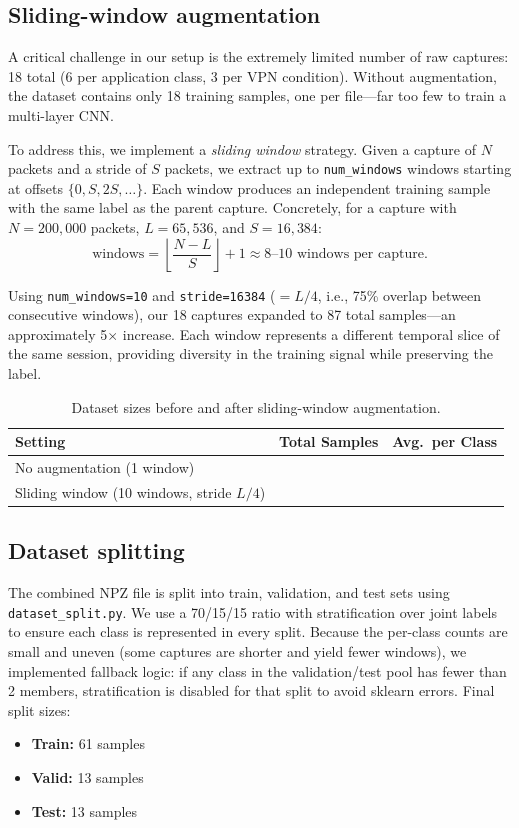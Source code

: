 \documentclass[letterpaper,twocolumn,10pt]{article}
\begin{document}
\subsection{Sliding-window augmentation}
\label{sec:augmentation}
A critical challenge in our setup is the extremely limited number of raw captures: 18 total (6 per application class, 3 per VPN condition). Without augmentation, the dataset contains only 18 training samples, one per file---far too few to train a multi-layer CNN.

To address this, we implement a \emph{sliding window} strategy. Given a capture of $N$ packets and a stride of $S$ packets, we extract up to \texttt{num\_windows} windows starting at offsets $\{0, S, 2S, \ldots\}$. Each window produces an independent training sample with the same label as the parent capture. Concretely, for a capture with $N = 200{,}000$ packets, $L = 65{,}536$, and $S = 16{,}384$:
\[
\text{windows} = \left\lfloor \frac{N - L}{S} \right\rfloor + 1 \approx 8\text{--}10 \text{ windows per capture}.
\]

Using \texttt{num\_windows=10} and \texttt{stride=16384} ($= L/4$, i.e., 75\% overlap between consecutive windows), our 18 captures expanded to 87 total samples---an approximately 5$\times$ increase. Each window represents a different temporal slice of the same session, providing diversity in the training signal while preserving the label.

\begin{table}[H]
\caption{Dataset sizes before and after sliding-window augmentation.}
\centering
\small
\begin{tabularx}{\linewidth}{l >{\centering\arraybackslash}X >{\centering\arraybackslash}X}
\toprule
\textbf{Setting} & \textbf{Total Samples} & \textbf{Avg.\ per Class} \\
\midrule
No augmentation (1 window) & 18 & 3 \\
Sliding window (10 windows, stride $L/4$) & 87 & 14.5 \\
\bottomrule
\end{tabularx}
\end{table}

\subsection{Dataset splitting}
The combined NPZ file is split into train, validation, and test sets using \texttt{dataset\_split.py}. We use a 70/15/15 ratio with stratification over joint labels to ensure each class is represented in every split. Because the per-class counts are small and uneven (some captures are shorter and yield fewer windows), we implemented fallback logic: if any class in the validation/test pool has fewer than 2 members, stratification is disabled for that split to avoid sklearn errors. Final split sizes:
\begin{itemize}[leftmargin=1.2em, topsep=0pt]
  \item \textbf{Train:} 61 samples
  \item \textbf{Valid:} 13 samples
  \item \textbf{Test:} 13 samples
\end{itemize}
\end{document}
